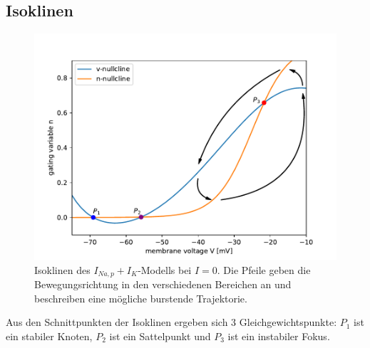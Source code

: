 \documentclass[12pt,a4paper]{article}
\begin{document}
\subsection{Isoklinen}
\begin{figure}[H]
	\centering
	\includegraphics[scale=0.5]{Isoklinen.pdf}\caption{Isoklinen des $I_{Na,p}+I_K$-Modells bei $I=0$. Die Pfeile geben die Bewegungsrichtung in den verschiedenen Bereichen an und beschreiben eine mögliche burstende Trajektorie.}
	\label{realnc}
\end{figure}
Aus den Schnittpunkten der Isoklinen ergeben sich 3 Gleichgewichtspunkte: $P_1$ ist ein stabiler Knoten, $P_2$ ist ein Sattelpunkt und $P_3$ ist ein instabiler Fokus. 
\end{document}
